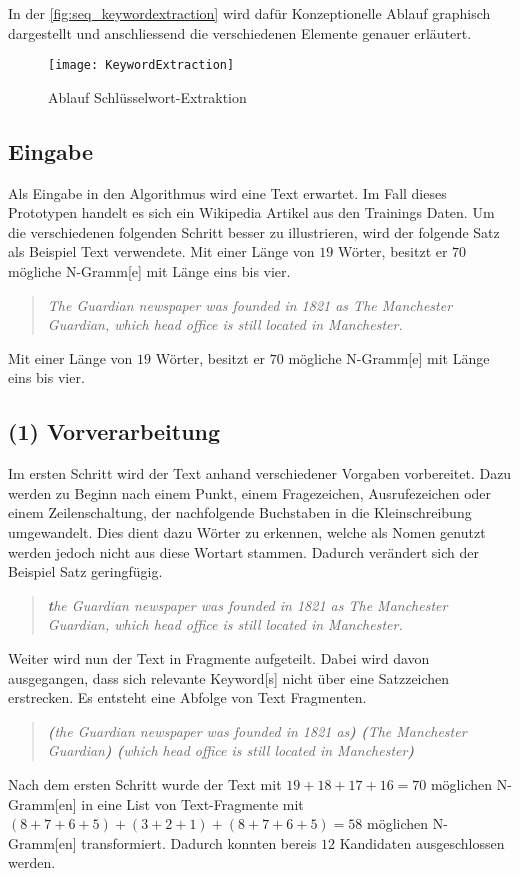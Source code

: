 In der \autoref{fig:seq_keywordextraction} wird dafür Konzeptionelle Ablauf graphisch dargestellt und anschliessend die verschiedenen Elemente genauer erläutert.

    \begin{figure}[H]
    \centering
    \texttt{[image: KeywordExtraction]}
    \caption{Ablauf Schlüsselwort-Extraktion}
    \label{fig:seq_keywordextraction}
    \end{figure}
 

\subsection{Eingabe}
Als Eingabe in den Algorithmus wird eine Text erwartet. Im Fall dieses Prototypen handelt es sich ein Wikipedia Artikel aus den Trainings Daten. Um die verschiedenen folgenden Schritt besser zu illustrieren, wird der folgende Satz als Beispiel Text verwendete. Mit einer Länge von $19$ Wörter, besitzt er $70$ mögliche \gls{N-Gramm}[e] mit Länge eins bis vier.

\begin{quote}
\textit{The Guardian newspaper was founded in 1821 as \glqq The Manchester Guardian\grqq, which head office is still located in Manchester.}
\end{quote}
Mit einer Länge von $19$ Wörter, besitzt er $70$ mögliche \gls{N-Gramm}[e] mit Länge eins bis vier.

\subsection{(1) Vorverarbeitung}
Im ersten Schritt wird der Text anhand verschiedener Vorgaben vorbereitet. Dazu werden zu Beginn nach einem Punkt, einem Fragezeichen, Ausrufezeichen oder einem Zeilenschaltung, der nachfolgende Buchstaben in die Kleinschreibung umgewandelt. Dies dient dazu Wörter zu erkennen, welche als Nomen genutzt werden jedoch nicht aus diese Wortart stammen. Dadurch verändert sich der Beispiel Satz geringfügig. 

\begin{quote}
\textit{\textbf{t}he Guardian newspaper was founded in 1821 as \glqq The Manchester Guardian\grqq, which head office is still located in Manchester.}
\end{quote}

Weiter wird nun der Text in Fragmente aufgeteilt. Dabei wird davon ausgegangen, dass sich relevante \gls{Keyword}[s] nicht über eine Satzzeichen erstrecken. Es entsteht eine Abfolge von Text Fragmenten.
\begin{quote}
\textit{\textbf{(}the Guardian newspaper was founded in 1821 as\textbf{)} \textbf{(}The Manchester Guardian\textbf{)} \textbf{(}which head office is still located in Manchester\textbf{)}}
\end{quote}
Nach dem ersten Schritt wurde der Text mit $19+18+17+16=70$ möglichen \gls{N-Gramm}[en] in eine List von Text-Fragmente mit $(8+7+6+5)+(3+2+1)+(8+7+6+5)=58$ möglichen \gls{N-Gramm}[en] transformiert. Dadurch konnten bereis $12$ Kandidaten ausgeschlossen werden.


